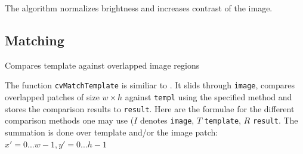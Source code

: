 The algorithm normalizes brightness and increases contrast of the image.

\subsection{Matching}

\label{MatchTemplate}

Compares template against overlapped image regions


\begin{description}
\end{description}

The function \texttt{cvMatchTemplate} is similiar to
. It slids through \texttt{image}, compares
overlapped patches of size $w \times h$ against \texttt{templ}
using the specified method and stores the comparison results to
\texttt{result}. Here are the formulae for the different comparison
methods one may use ($I$ denotes \texttt{image}, $T$ \texttt{template},
$R$ \texttt{result}. The summation is done over template and/or the
image patch: $x' = 0...w-1, y' = 0...h-1$


